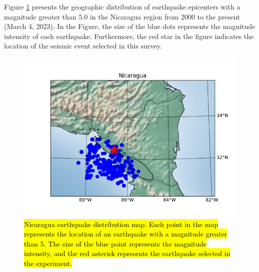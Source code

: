 \documentclass[3p,authoryear,preprint,12pt]{elsarticle}
\begin{document}
Figure \ref{fig:nicaragua} presents {the geographic distribution of earthquake epicenters} with a magnitude greater than 5.0 in the Nicaragua region from 2000 to the present (March 4, 2023). In the {Figure}, the size of the blue dots represents the magnitude intensity of each earthquake. Furthermore, the red {star} in the figure indicates the location of {the seismic event selected in this survey}.
\begin{figure}[htbp]
	\centering
	\includegraphics[width=0.8\linewidth]{Nicaragua_1990-01-01-2024-01-01}
	\caption{\hl{Nicaragua earthquake distribution map. Each point in the map represents the location of an earthquake with a magnitude greater than 5. The size of the blue point represents the magnitude intensity, and the red asterisk represents the earthquake selected in the experiment.}}
	\label{fig:nicaragua}
\end{figure}
\end{document}
